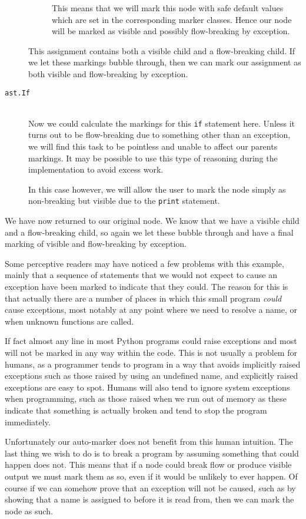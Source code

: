 \documentclass[twoside,a4paper]{report}
\begin{document}
\begin{description}
\begin{description}
    This means that we will mark this node with safe default values which are set in the corresponding marker classes. Hence our node will be marked
    as visible and possibly flow-breaking by exception.
  \end{description}
  This assignment contains both a visible child and a flow-breaking child. If we let these markings bubble through, then we can mark our assignment
  as both visible and flow-breaking by exception. 

  \item[\texttt{ast.If}] \hfill \\
  Now we could calculate the markings for this \texttt{if} statement here. Unless it turns out to be flow-breaking due to something other than an
  exception, we will find this task to be pointless and unable to affect our parents markings. It may be possible to use this type of reasoning
  during the implementation to avoid excess work.

  In this case however, we will allow the user to mark the node simply as non-breaking but visible due to the \texttt{print} statement.
\end{description}

We have now returned to our original node. We know that we have a visible child and a flow-breaking child, so again we let these bubble through
and have a final marking of visible and flow-breaking by exception.

Some perceptive readers may have noticed a few problems with this example, mainly that a sequence of statements that we would not expect to cause an exception
have been marked to indicate that they could. The reason for this is that actually there are a number of places in which this small program \textit{could} cause
exceptions, most notably at any point where we need to resolve a name, or when unknown functions are called.

If fact almost any line in most Python programs could raise exceptions and most will not be marked in any way within the code. This is not usually a
problem for humans, as a programmer tends to program in a way that avoids implicitly raised exceptions such as those raised by using an undefined name,
and explicitly raised exceptions are easy to spot. Humans will also tend to ignore system exceptions when programming, such as those raised when we run
out of memory as these indicate that something is actually broken and tend to stop the program immediately.

Unfortunately our auto-marker does not benefit from this human intuition. The last thing we wish to do is to break a program by assuming something that
could happen does not. This means that if a node could break flow or produce visible output we must mark them as so, even if it would be unlikely to ever
happen. Of course if we can somehow prove that an exception will not be caused, such as by showing that a name is assigned to before it is read from,
then we can mark the node as such.
\end{document}
